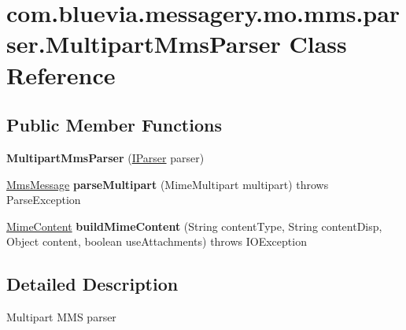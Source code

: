 \hypertarget{classcom_1_1bluevia_1_1messagery_1_1mo_1_1mms_1_1parser_1_1MultipartMmsParser}{
\section{com.bluevia.messagery.mo.mms.parser.MultipartMmsParser Class Reference}
\label{classcom_1_1bluevia_1_1messagery_1_1mo_1_1mms_1_1parser_1_1MultipartMmsParser}
}
\subsection*{Public Member Functions}
\begin{DoxyCompactItemize}
\item 
\hypertarget{classcom_1_1bluevia_1_1messagery_1_1mo_1_1mms_1_1parser_1_1MultipartMmsParser_a733deace84e9506f4eae4bab8fb21c80}{
{\bfseries MultipartMmsParser} (\hyperlink{interfacecom_1_1bluevia_1_1commons_1_1parser_1_1IParser}{IParser} parser)}
\label{classcom_1_1bluevia_1_1messagery_1_1mo_1_1mms_1_1parser_1_1MultipartMmsParser_a733deace84e9506f4eae4bab8fb21c80}

\item 
\hypertarget{classcom_1_1bluevia_1_1messagery_1_1mo_1_1mms_1_1parser_1_1MultipartMmsParser_aa2160dd6bc5ce627453fa4490d4aadcf}{
\hyperlink{classcom_1_1bluevia_1_1messagery_1_1mo_1_1mms_1_1data_1_1MmsMessage}{MmsMessage} {\bfseries parseMultipart} (MimeMultipart multipart)  throws ParseException }
\label{classcom_1_1bluevia_1_1messagery_1_1mo_1_1mms_1_1parser_1_1MultipartMmsParser_aa2160dd6bc5ce627453fa4490d4aadcf}

\item 
\hypertarget{classcom_1_1bluevia_1_1messagery_1_1mo_1_1mms_1_1parser_1_1MultipartMmsParser_adac446f884b1ec411055d5e12f38177f}{
\hyperlink{classcom_1_1bluevia_1_1messagery_1_1mo_1_1mms_1_1data_1_1MimeContent}{MimeContent} {\bfseries buildMimeContent} (String contentType, String contentDisp, Object content, boolean useAttachments)  throws IOException}
\label{classcom_1_1bluevia_1_1messagery_1_1mo_1_1mms_1_1parser_1_1MultipartMmsParser_adac446f884b1ec411055d5e12f38177f}

\end{DoxyCompactItemize}


\subsection{Detailed Description}
Multipart MMS parser 